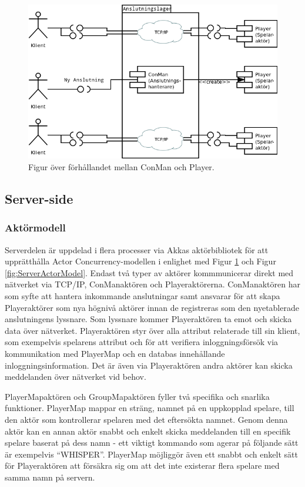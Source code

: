 \documentclass[a4paper]{article}
\begin{document}
\begin{figure}[hbt]
\centering
\includegraphics[width=1.0\textwidth]{serverActorModel2-1}
\caption{\label{fig:ConManPlayer}Figur över förhållandet mellan ConMan och Player.}
\end{figure}
\subsection{Server-side}

\subsubsection{Aktörmodell}
Serverdelen är uppdelad i flera processer via Akkas aktörbibliotek för att upprätthålla Actor Concurrency-modellen i enlighet med Figur \ref{fig:ConManPlayer} och Figur \ref{fig:ServerActorModel}. 
Endast två typer av aktörer kommmunicerar direkt med nätverket via TCP/IP, ConManaktören och Playeraktörerna. ConManaktören har som syfte att hantera inkommande anslutningar samt ansvarar 
för att skapa Playeraktörer som nya högnivå aktörer innan de registreras som den nyetablerade anslutningens lyssnare. Som lyssnare kommer Playeraktören ta emot och skicka data 
över nätverket. Playeraktören styr över alla attribut relaterade till sin klient, som exempelvis spelarens attribut och för att verifiera 
inloggningsförsök via kommunikation med PlayerMap och en databas innehållande inloggningsinformation. Det är även via Playeraktören andra aktörer kan skicka meddelanden över nätverket vid behov. 

PlayerMapaktören och GroupMapaktören fyller två specifika och snarlika funktioner. PlayerMap mappar en sträng, namnet på en uppkopplad spelare, till den aktör som kontrollerar 
spelaren med det eftersökta namnet. Genom denna aktör kan en annan aktör snabbt och enkelt skicka meddelanden till en specifik spelare baserat på dess namn - 
ett viktigt kommando som agerar på följande sätt är exempelvis “WHISPER”. PlayerMap möjliggör även ett snabbt och enkelt sätt för Playeraktören att försäkra 
sig om att det inte existerar flera spelare med samma namn på servern.
\end{document}
